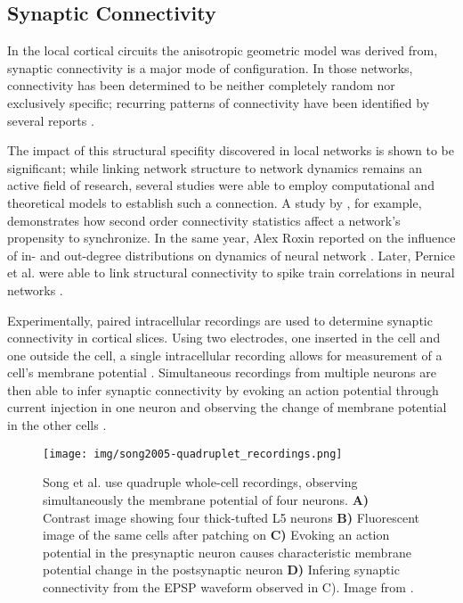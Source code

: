 \subsection*{Synaptic Connectivity}

In the local cortical circuits the anisotropic geometric model was
derived from, synaptic connectivity is a major mode of configuration.
In those networks, connectivity has been determined to be neither
completely random nor exclusively specific; recurring patterns of
connectivity have been identified by several
reports \parencite{Sporns2004,Song2005,Perin2011}.

The impact of this structural specifity discovered in local networks
is shown to be significant; while linking network structure to network
dynamics remains an active field of research, several studies were
able to employ computational and theoretical models to establish such
a connection. A study by \textcite{Zhao2011}, for example,
demonstrates how second order connectivity statistics affect a
network's propensity to synchronize. In the same year, Alex Roxin
reported on the influence of in- and out-degree distributions on
dynamics of neural network \parencite{Roxin2011}. Later,
Pernice et al. were able to link structural connectivity to spike
train correlations in neural networks
\parencite{Pernice2011}.

Experimentally, paired intracellular recordings are used to
 determine
synaptic connectivity in cortical slices. Using two electrodes, one
inserted in the cell and one outside the cell, a single intracellular
recording allows for measurement of a cell's membrane potential
\parencites[Chapter 3]{Brette_Neural-activity}[]{Scholarpedia-IntracellularRecording}. Simultaneous
recordings from multiple neurons are then able to infer synaptic
connectivity by evoking an action potential through current injection
in one neuron and observing the change of membrane potential in the
other cells \parencite{Song2005}.

\begin{figure}[H]
  \centering
  \texttt{[image: img/song2005-quadruplet\_recordings.png]}
  \caption{Song et al. use quadruple whole-cell recordings, observing
    simultaneously the membrane potential of four neurons.
    \textbf{A)} Contrast image showing four thick-tufted L5 neurons
    \textbf{B)} Fluorescent image of the same cells after patching on
    \textbf{C)} Evoking an action potential in the presynaptic neuron
    causes characteristic membrane potential change in the
    postsynaptic neuron \textbf{D)} Infering synaptic connectivity
    from the EPSP waveform observed in C). Image from \textcite{Song2005}.
  }
\end{figure}

